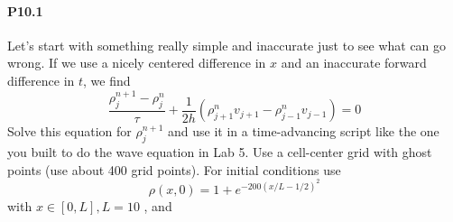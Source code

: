 \paragraph*{P10.1}
Let\rq s start with something really simple and inaccurate just to see what can
go wrong. If we use a nicely centered difference in $x$ and an inaccurate
forward difference in $t$, we find
\begin{equation}\label{eq:102}
\frac{\rho_{j}^{n+1}-\rho_{j}^{n}}{\tau}+\frac{1}{2 h}\left(\rho_{j+1}^{n} v_{j+1}-\rho_{j-1}^{n} v_{j-1}\right)=0
\end{equation}
Solve this equation for $\rho_{j}^{n+1}$ and use it in a time-advancing script like the one you built to do the wave equation in Lab 5. Use a cell-center grid with ghost points (use about 400 grid points). For initial conditions use
\begin{equation}\label{eq:103}
\rho(x, 0)=1+e^{-200(x / L-1 / 2)^{2}}
\end{equation}
with $ x \in[0, L], L=10$ , and


